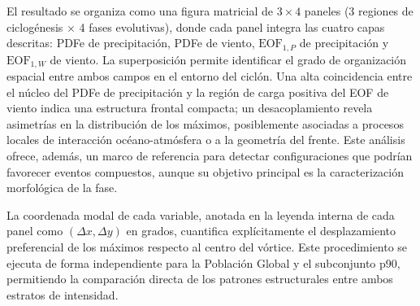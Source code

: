 El resultado se organiza como una figura matricial de $3 \times 4$ paneles (3 regiones de ciclogénesis $\times$ 4 fases evolutivas), donde cada panel integra las cuatro capas descritas: PDFe de precipitación, PDFe de viento, $\text{EOF}_{1,P}$ de precipitación y $\text{EOF}_{1,W}$ de viento. La superposición permite identificar el grado de organización espacial entre ambos campos en el entorno del ciclón. Una alta coincidencia entre el núcleo del PDFe de precipitación y la región de carga positiva del EOF de viento indica una estructura frontal compacta; un desacoplamiento revela asimetrías en la distribución de los máximos, posiblemente asociadas a procesos locales de interacción océano-atmósfera o a la geometría del frente. Este análisis ofrece, además, un marco de referencia para detectar configuraciones que podrían favorecer eventos compuestos, aunque su objetivo principal es la caracterización morfológica de la fase.

La coordenada modal de cada variable, anotada en la leyenda interna de cada panel como $(\Delta x, \Delta y)$ en grados, cuantifica explícitamente el desplazamiento preferencial de los máximos respecto al centro del vórtice. Este procedimiento se ejecuta de forma independiente para la Población Global y el subconjunto p90, permitiendo la comparación directa de los patrones estructurales entre ambos estratos de intensidad.